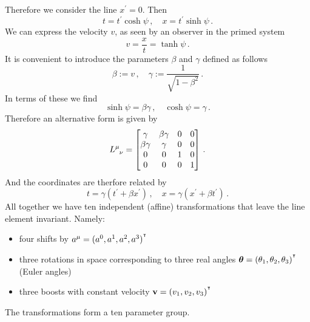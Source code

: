 Therefore we consider the line $x^\prime= 0$.
Then
\begin{equation}
    t=t^\prime\cosh\psi\, ,\quad
    x=t^\prime\sinh\psi\, .
\end{equation}
We can express the velocity $v$, as seen by an observer in the primed system
\begin{equation}
    v=\frac{x}{t}=\tanh\psi\,.
\end{equation}
It is convenient to introduce the parameters $\beta$ and $\gamma$ defined as
follows
\begin{equation}
    \beta:=v\, ,\quad\gamma:=\frac{1}{\sqrt{1-\beta^2}}\, .
\end{equation}
In terms of these we find
\begin{equation}
    \sinh\psi = \beta\gamma\, , \quad \cosh\psi=\gamma\,.
\end{equation}
Therefore an alternative form is given by
\begin{equation}
    \tensor{L}{^\mu_\nu}=\begin{bmatrix}
\gamma&\beta\gamma & 0&0\\
\beta\gamma&\gamma &0&0\\
0&0&1 &0\\
0&0 &0 &1
\end{bmatrix}\, .
\end{equation}
And the coordinates are therfore related by
\begin{equation}
    t=\gamma\left(t^\prime+\beta x^\prime\right)\,,\quad
    x=\gamma\left(x^\prime+\beta t^\prime\right)\, .
\end{equation}
All together we have ten independent (affine) transformations that leave the
line element invariant. Namely:
\begin{itemize}
    \item four shifts by $a^\mu=(a^0,a^1,a^2,a^3)^{^\intercal}$
    \item three rotations in space corresponding to three real angles
    $\boldsymbol{\theta}=(\theta_1,\theta_2,\theta_3)^{^\intercal}$ (Euler angles)
    \item three boosts with constant velocity $\mathbf{v}=(v_1,v_2,v_3)^{^\intercal}$
\end{itemize}
The  transformations form a ten parameter group.
